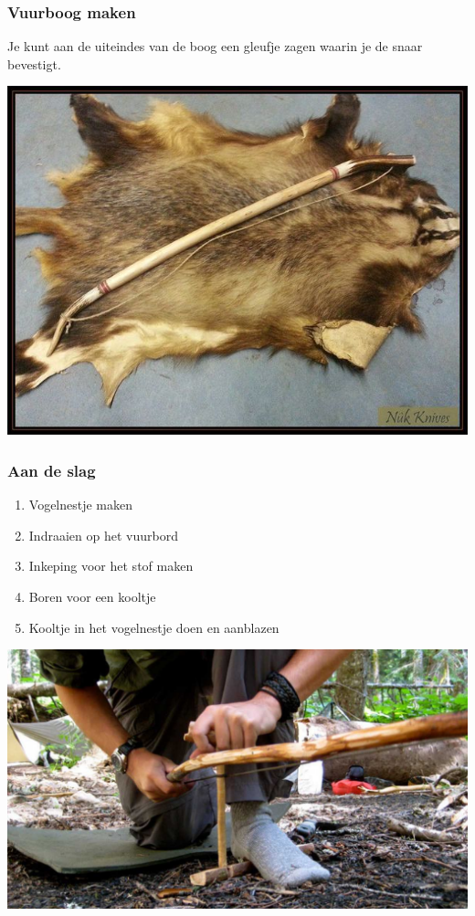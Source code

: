 \documentclass[a4paper, handout]{beamer}
\begin{document}
\begin{frame}
	\frametitle{Vuurboog maken}
	Je kunt aan de uiteindes van de boog een gleufje zagen waarin je de snaar bevestigt.

	\includegraphics[scale=0.4]{vuurboog}

\end{frame}
\begin{frame}
	\frametitle{Aan de slag}
	\begin{enumerate}
		\item{Vogelnestje maken}
		\item{Indraaien op het vuurbord}
		\item{Inkeping voor het stof maken}
		\item{Boren voor een kooltje}
		\item{Kooltje in het vogelnestje doen en aanblazen}
	\end{enumerate}

	\includegraphics[width=\linewidth]{vuurboog-actie}

\end{frame}
\end{document}
